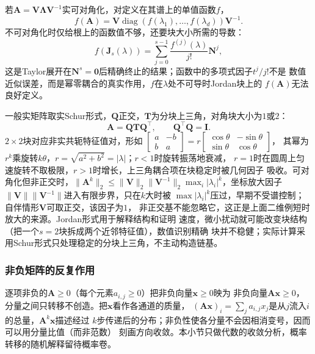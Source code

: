 若$\bm A=\bm V\bm\Lambda\bm V^{-1}$实可对角化，对定义在其谱上的单值函数$f$，
\begin{equation}
 f(\bm A)=\bm V\operatorname{diag}(f(\lambda_1),\ldots,f(\lambda_d))\bm V^{-1}.
 \label{eq:matrix-analysis-matrix-function-diagonalizable}
\end{equation}
不可对角化时仅给根上的函数值不够，还要块大小所需的导数：
\begin{equation}
 f(\bm J_s(\lambda))=\sum_{j=0}^{s-1}\frac{f^{(j)}(\lambda)}{j!}\bm N^j,
 \label{eq:ch06-jordan-function}
\end{equation}
这是Taylor展开在$\bm N^s=\bm0$后精确终止的结果；函数中的多项式因子$t^j/j!$不是
数值近似误差，而是幂零耦合的真实作用，$f$在$\lambda$处不可导时Jordan块上的
$f(\bm A)$无法良好定义。

一般实矩阵取实Schur形式，$\bm Q$正交，$\bm T$为分块上三角，对角块大小为$1$或$2$：
\begin{equation}
 \bm A=\bm Q\bm T\bm Q^{\top},\qquad \bm Q^{\top}\bm Q=\bm I.
 \label{eq:matrix-analysis-schur-decomposition}
\end{equation}
$2\times2$块对应非实共轭特征值对，形如
$\begin{bmatrix}a&-b\\b&a\end{bmatrix}=r\!\begin{bmatrix}\cos\theta&-\sin\theta\\\sin\theta&\cos\theta\end{bmatrix}$，
其幂为$r^k$乘旋转$k\theta$，$r=\sqrt{a^2+b^2}=|\lambda|$；$r<1$时旋转振荡地衰减，
$r=1$时在圆周上匀速旋转不取极限，$r>1$时增长，上三角耦合项在块稳定时被几何因子
吸收。可对角化但非正交时，$\lVert\bm A^k\rVert_2\leq
\lVert\bm V\rVert_2\lVert\bm V^{-1}\rVert_2\max_i|\lambda_i|^k$，坐标放大因子
$\lVert\bm V\rVert\lVert\bm V^{-1}\rVert$进入有限步界，只在$k$大时被
$\max|\lambda_i|^k$压过，早期不受谱控制；自伴情形$\bm V$可取正交，该因子为$1$，
非正交基不能忽略它，这正是上面二维例短时放大的来源。Jordan形式用于解释结构和证明
速度，微小扰动就可能改变块结构（把一个$s=2$块拆成两个近邻特征值），数值识别精确
块并不稳健；实际计算采用Schur形式只处理稳定的分块上三角，不主动构造链基。

\subsubsection{非负矩阵的反复作用}

逐项非负的$\bm A\geq0$（每个元素$a_{i,j}\geq0$）把非负向量$\bm x\geq0$映为
非负向量$\bm A\bm x\geq0$，分量之间只转移不创造。把$\bm x$看作各通道的质量，
$(\bm A\bm x)_i=\sum_j a_{i,j}x_j$是从$j$流入$i$的总量，$\bm A^k\bm x$描述经过
$k$步传递后的分布；非负性使各分量不会因相消变号，因而可以用分量比值（而非范数）
刻画方向收敛。本小节只做代数的收敛分析，概率转移的随机解释留待概率卷。

